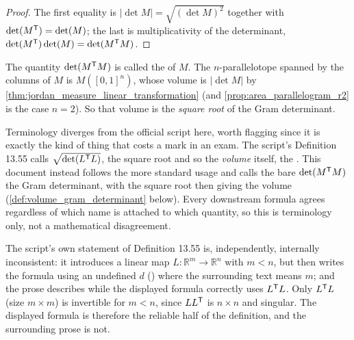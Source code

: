 \begin{proof}
The first equality is $|\det M| = \sqrt{(\det M)^2}$ together with $\det(M^{\mathsf{T}})=\det(M)$;
the last is multiplicativity of the determinant, $\det(M^{\mathsf{T}})\det(M)=\det(M^{\mathsf{T}} M)$.
\end{proof}

The quantity $\det(M^{\mathsf{T}} M)$ is called the 
 of $M$. The $n$-parallelotope spanned by the columns of $M$ is
$M([0,1]^n)$, whose volume is $\lvert\det M\rvert$ by
\cref{thm:jordan_measure_linear_transformation} (and \cref{prop:area_parallelogram_r2} is the case
$n=2$). So that volume is the \emph{square root} of the Gram determinant.

\begin{ainote}
Terminology diverges from the official script here, worth flagging since it is exactly the kind
of thing that costs a mark in an exam. The script's Definition 13.55 calls $\sqrt{\det(L^{\mathsf{T}}
L)}$, the square root and so the \emph{volume} itself, the . This
document instead follows the more standard usage and calls the bare $\det(M^{\mathsf{T}} M)$ the Gram
determinant, with the square root then giving the volume (\cref{def:volume_gram_determinant}
below). Every downstream formula agrees regardless of which name is attached to which quantity,
so this is terminology only, not a mathematical disagreement.

The script's own statement of Definition 13.55 is, independently, internally inconsistent: it
introduces a linear map $L:\mathbb{R}^m\to\mathbb{R}^n$ with $m<n$, but then writes the formula
using an undefined $d$ () where the surrounding text
means $m$; and the prose describes  while the
displayed formula correctly uses $L^{\mathsf{T}} L$. Only $L^{\mathsf{T}} L$ (size $m\times m$) is invertible
for $m<n$, since $LL^{\mathsf{T}}$ is $n\times n$ and singular. The displayed formula is therefore the
reliable half of the definition, and the surrounding prose is not.
\end{ainote}

